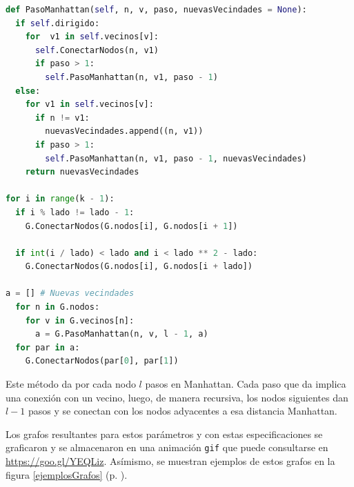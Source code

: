 \documentclass{article}
\begin{document}
  \begin{lstlisting}[language = Python]
def PasoManhattan(self, n, v, paso, nuevasVecindades = None):
  if self.dirigido:
    for  v1 in self.vecinos[v]:
      self.ConectarNodos(n, v1)
      if paso > 1:
        self.PasoManhattan(n, v1, paso - 1)
  else:
    for v1 in self.vecinos[v]:
      if n != v1:
        nuevasVecindades.append((n, v1))
      if paso > 1:
        self.PasoManhattan(n, v1, paso - 1, nuevasVecindades)
    return nuevasVecindades

for i in range(k - 1):
  if i % lado != lado - 1:
    G.ConectarNodos(G.nodos[i], G.nodos[i + 1])

  if int(i / lado) < lado and i < lado ** 2 - lado:
    G.ConectarNodos(G.nodos[i], G.nodos[i + lado])

a = [] # Nuevas vecindades
  for n in G.nodos:
    for v in G.vecinos[n]:
      a = G.PasoManhattan(n, v, l - 1, a)
  for par in a:
    G.ConectarNodos(par[0], par[1])
  \end{lstlisting}

  Este método da por cada nodo $l$ pasos en Manhattan. Cada paso que da implica una conexión con un vecino, luego, de manera recursiva, los nodos siguientes dan $l - 1$ pasos y se conectan con los nodos adyacentes a esa distancia Manhattan.

  Los grafos resultantes para estos parámetros y con estas especificaciones se graficaron y se almacenaron en una animación \texttt{gif} que puede consultarse en \url{https://goo.gl/YEQLiz}. Asímismo, se muestran ejemplos de estos grafos en la figura \ref{ejemplosGrafos} (p. \pageref{ejemplosGrafos}).
\end{document}
